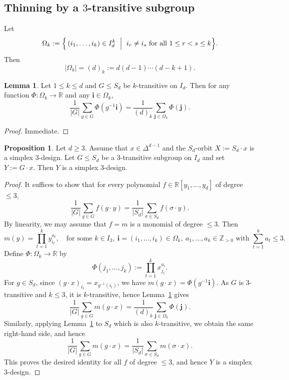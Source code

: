 \documentclass{amsart}
\theoremstyle{definition}
\newtheorem{proposition}[theorem]{Proposition}
\newtheorem{lemma}[theorem]{Lemma}
\theoremstyle{remark}
\numberwithin{equation}{section}
\newcommand{\Z}{{\mathbb Z}}
\begin{document}
\subsection{Thinning by a $3$-transitive subgroup}

Let
\[
\Omega_k
:=
\Bigl\{\, (i_1,\dots,i_k)\in I_d^k
\ \Bigm|\ 
i_r\neq i_s\ \text{for all}\ 1\le r<s\le k
\Bigr\}.
\]
Then
\[
|\Omega_k|=(d)_k:=d(d-1)\cdots(d-k+1).
\]

\begin{lemma}\label{lem:ktrans-avg}
Let $1\le k\le d$ and $G\le S_d$ be $k$-transitive on $I_d$.
Then for any function $\Phi:\Omega_k\to\mathbb R$ and any $\mathbf i\in\Omega_k$,
\[
\frac1{|G|}\sum_{g\in G}\Phi(g^{-1}\mathbf i)
=\frac1{(d)_k}\sum_{\mathbf j\in\Omega_k}\Phi(\mathbf j).
\]
\end{lemma}

\begin{proof}
Immediate.
\end{proof}

\begin{proposition}\label{prop:3trans-suborbit}
Let $d\ge 3$.
Assume that $x\in\Delta^{d-1}$ and the $S_d$-orbit $X:=S_d\cdot x$ is a simplex $3$-design.
Let $G\le S_d$ be a $3$-transitive subgroup on $I_d$ and set $Y:=G\cdot x$.
Then $Y$ is a simplex $3$-design.
\end{proposition}

\begin{proof}
It suffices to show that for every polynomial $f\in\mathbb R[y_1,\dots,y_d]$ of degree $\le 3$,
\[
\frac1{|G|}\sum_{g\in G} f(g\cdot y)
=\frac1{|S_d|}\sum_{\sigma\in S_d} f(\sigma\cdot y).
\]
By linearity, we may assume that $f=m$ is a monomial of degree $\le 3$.
Then
\[
m(y)=\prod_{t=1}^k y_{i_t}^{a_t},
\quad \text{for some } k\in I_3,\ \mathbf{i}=(i_1,\dots,i_k)\in\Omega_k,\ a_1,\dots,a_k\in\Z_{>0}
\text{ with }\sum_{t=1}^k a_t\le 3.
\]
Define $\Phi:\Omega_k\to\mathbb R$ by
\[
\Phi(j_1,\dots,j_k):=\prod_{t=1}^k x_{j_t}^{a_t}.
\]
For $g\in S_d$, since $(g\cdot x)_{i_t}=x_{g^{-1}(i_t)}$, we have $m(g\cdot x)=\Phi(g^{-1}\mathbf i)$.
As $G$ is $3$-transitive and $k\le 3$, it is $k$-transitive, hence Lemma~\ref{lem:ktrans-avg} gives
\[
\frac1{|G|}\sum_{g\in G} m(g\cdot x)
=\frac1{(d)_k}\sum_{\mathbf j\in\Omega_k}\Phi(\mathbf j).
\]
Similarly, applying Lemma~\ref{lem:ktrans-avg} to $S_d$ which is also $k$-transitive, we obtain the same right-hand side, and hence
\[
\frac1{|G|}\sum_{g\in G} m(g\cdot x)
=\frac1{|S_d|}\sum_{\sigma\in S_d} m(\sigma\cdot x).
\]
This proves the desired identity for all $f$ of degree $\le 3$, and hence $Y$ is a simplex $3$-design.
\end{proof}
\end{document}
